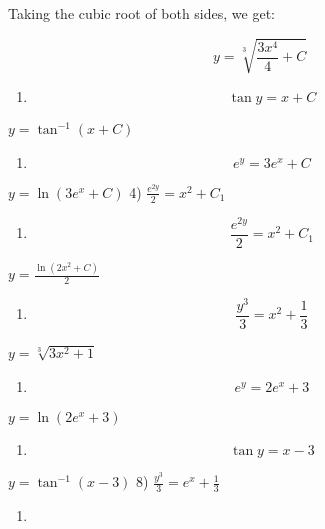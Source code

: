\documentclass[
]{article}
\providecommand{\tightlist}{%
  \setlength{\itemsep}{0pt}\setlength{\parskip}{0pt}}
\begin{document}
Taking the cubic root of both sides, we get:

\[y = \sqrt[3]{\frac{3x^4}{4} + C}\]

\begin{enumerate}
\def\labelenumi{\arabic{enumi})}
\setcounter{enumi}{1}
\tightlist
\item
  \[\tan y = x + C\]
\end{enumerate}

\(y = \tan^{-1} (x + C)\)

\begin{enumerate}
\def\labelenumi{\arabic{enumi})}
\setcounter{enumi}{2}
\tightlist
\item
  \[e^y = 3e^x + C\]
\end{enumerate}

\(y = \ln (3e^x + C)\) 4) \(\frac{e^{2y}}{2} = x^2 + C_1\)

\begin{enumerate}
\def\labelenumi{\arabic{enumi})}
\setcounter{enumi}{3}
\tightlist
\item
  \[\frac{e^{2y}}{2} = x^2 + C_1\]
\end{enumerate}

\(y = \frac{\ln(2x^2 + C)}{2}\)

\begin{enumerate}
\def\labelenumi{\arabic{enumi})}
\setcounter{enumi}{4}
\tightlist
\item
  \[\frac{y^3}{3} = x^2 + \frac{1}{3}\]
\end{enumerate}

\(y = \sqrt[3]{3x^2 + 1}\)

\begin{enumerate}
\def\labelenumi{\arabic{enumi})}
\setcounter{enumi}{5}
\tightlist
\item
  \[e^y = 2e^x + 3\]
\end{enumerate}

\(y = \ln (2e^x + 3)\)

\begin{enumerate}
\def\labelenumi{\arabic{enumi})}
\setcounter{enumi}{6}
\tightlist
\item
  \[\tan y = x - 3\]
\end{enumerate}

\(y = \tan^{-1}(x - 3)\) 8) \(\frac{y^3}{3} = e^x + \frac{1}{3}\)

\begin{enumerate}
\def\labelenumi{\arabic{enumi})}
\setcounter{enumi}{7}
\tightlist
\item
\end{enumerate}
\end{document}
